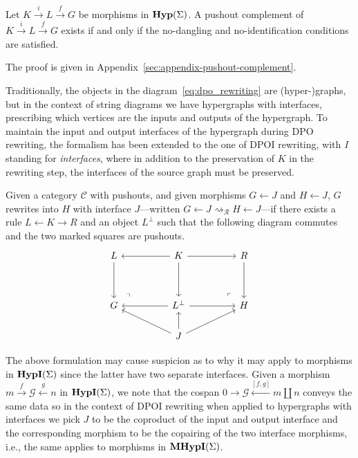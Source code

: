 \begin{proposition}\label{prop:pushout_complement_exists}
  Let $K \xrightarrow{i} L \xrightarrow{f} G$ be morphisms in $\mathbf{Hyp}(\Sigma)$.
  A pushout complement of $K \xrightarrow{i} L \xrightarrow{f} G$ exists if and only if the no-dangling and no-identification conditions are satisfied.
\end{proposition}

The proof is given in Appendix~\ref{sec:appendix-pushout-complement}.

Traditionally, the objects in the diagram~\ref{eq:dpo_rewriting} are (hyper-)graphs, but in the context of string diagrams we have hypergraphs with interfaces, prescribing which vertices are the inputs and outputs of the hypergraph.
To maintain the input and output interfaces of the hypergraph during DPO rewriting, the formalism has been extended to the one of DPOI rewriting, with \emph{I} standing for \emph{interfaces}, where in addition to the preservation of $K$ in the rewriting step, the interfaces of the source graph must be preserved.
\begin{definition}\label{def:dpoi_rewriting}
Given a category $\mathcal{C}$ with pushouts, and given morphisms $G \xleftarrow{} J$ and $H \xleftarrow{} J$, $G$ rewrites into $H$ with interface $J$---written $G \xleftarrow{} J \rightsquigarrow_{\mathcal{R}} H \xleftarrow{} J$---if there exists a rule $L \xleftarrow{} K \xrightarrow{} R$ and an object $L^{\bot}$ such that the following diagram commutes and the two marked squares are pushouts.
\[\begin{tikzcd}
	L && K && R \\
	\\
	G && {L^{\bot}} && H \\
	&& J
	\arrow[from=1-1, to=3-1]
	\arrow[from=1-3, to=1-1]
	\arrow[from=1-3, to=1-5]
	\arrow[from=1-3, to=3-3]
	\arrow[from=1-5, to=3-5]
	\arrow["\lrcorner"{anchor=center, pos=0.125, rotate=90}, draw=none, from=3-1, to=1-3]
	\arrow[from=3-3, to=3-1]
	\arrow[from=3-3, to=3-5]
	\arrow["\lrcorner"{anchor=center, pos=0.125, rotate=180}, draw=none, from=3-5, to=1-3]
	\arrow[from=4-3, to=3-1]
	\arrow[from=4-3, to=3-3]
	\arrow[from=4-3, to=3-5]
\end{tikzcd}\]
\end{definition}
\begin{remark}\label{remark:dpoi_interface_swap}
The above formulation may cause suspicion as to why it may apply to morphisms in $\mathbf{HypI}(\Sigma)$ since the latter have two separate interfaces.
Given a morphism $m \xrightarrow{f} \mathcal{G} \xleftarrow{g} n$ in $\mathbf{HypI}(\Sigma)$, we note that the cospan $0 \xrightarrow{} \mathcal{G} \xleftarrow{[f,g]} m \coprod n$ conveys the same data so in the context of DPOI rewriting when applied to hypergraphs with interfaces we pick $J$ to be the coproduct of the input and output interface and the corresponding morphism to be the copairing of the two interface morphisms, i.e., the same applies to morphisms in $\mathbf{MHypI}(\Sigma)$.
\end{remark}
